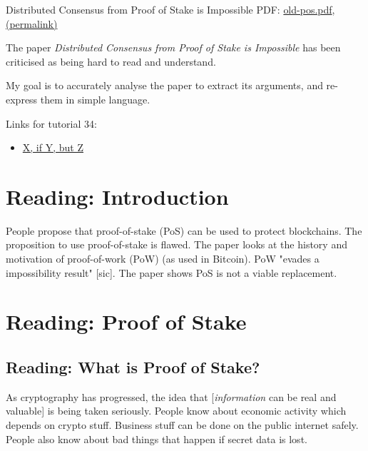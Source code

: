 \documentclass{article}
\begin{document}
Distributed Consensus from Proof of Stake is Impossible PDF: \href{../../files/pdfs/2014-05-28-distributed-consensus-pos/old-pos.pdf}{old-pos.pdf}, \href{https://xertrov.github.io/fi/files/pdfs/2014-05-28-distributed-consensus-pos/old-pos.pdf}{(permalink)}

The paper \emph{Distributed Consensus from Proof of Stake is Impossible} has been criticised as being hard to read and understand.

My goal is to accurately analyse the paper to extract its arguments, and re-express them in simple language.

Links for tutorial 34:

\begin{itemize}
    \item \hyperlink{ex10}{X, if Y, but Z}
\end{itemize}


\tableofcontents

\section{Reading: Introduction}

People propose that proof-of-stake (PoS) can be used to protect blockchains.
The proposition to use proof-of-stake is flawed.
The paper looks at the history and motivation of proof-of-work (PoW) (as used in Bitcoin).
PoW "evades a impossibility result" [sic].
The paper shows PoS is not a viable replacement.

\section{Reading: Proof of Stake}

\subsection{Reading: What is Proof of Stake?}

As cryptography has progressed, the idea that [\emph{information} can be real and valuable] is being taken seriously.
People know about economic activity which depends on crypto stuff.
Business stuff can be done on the public internet safely.
People also know about bad things that happen if secret data is lost.
\end{document}
